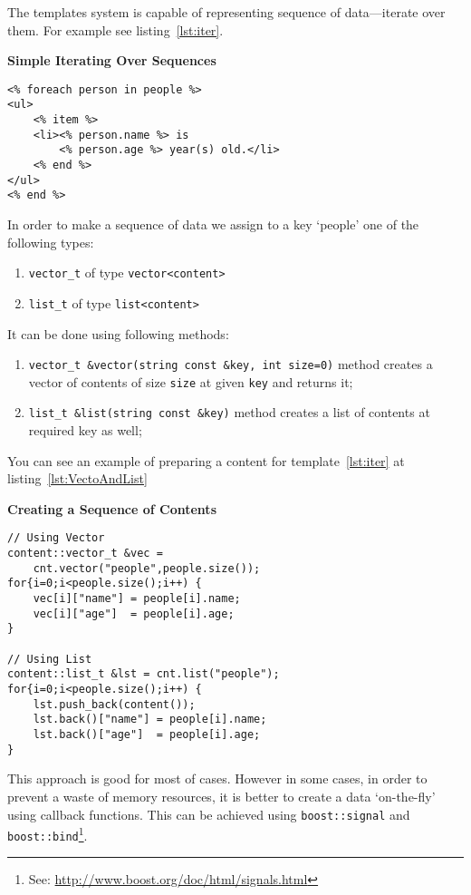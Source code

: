 \documentclass{article}
\newcommand{\tw}[1]{\texttt{#1}}
\renewcommand{\caption}[1]{\textbf{#1}}
\begin{document}
The templates system is capable of representing sequence of data---iterate over them. For example see listing~\ref{lst:iter}.

\begin{program}
\caption{Simple Iterating Over Sequences\label{lst:iter}}
\begin{verbatim}
<% foreach person in people %>
<ul>
    <% item %>
    <li><% person.name %> is 
        <% person.age %> year(s) old.</li>
    <% end %> 
</ul>
<% end %>
\end{verbatim}
\end{program}

In order to make a sequence of data we assign to a key `people' one of the following types:
\begin{enumerate}
\item \verb+vector_t+ of type \verb+vector<content>+
\item \verb+list_t+ of type \verb+list<content>+
\end{enumerate}
It can be done using following methods:
\begin{enumerate}
\item \verb+vector_t &vector(string const &key, int size=0)+ 
 method creates a vector of contents of size \tw{size} at given \tw{key} and returns it;
\item \verb+list_t &list(string const &key)+ 
 method creates a list of contents at required key as well;
\end{enumerate}

You can see an example of preparing a content for template~\ref{lst:iter} at listing~\ref{lst:VectoAndList}
\begin{program}
\caption{Creating a Sequence of Contents\label{lst:VectoAndList}}
\begin{verbatim}
// Using Vector
content::vector_t &vec = 
    cnt.vector("people",people.size());
for{i=0;i<people.size();i++) {
    vec[i]["name"] = people[i].name;
    vec[i]["age"]  = people[i].age;
}

// Using List
content::list_t &lst = cnt.list("people");
for{i=0;i<people.size();i++) {
    lst.push_back(content());
    lst.back()["name"] = people[i].name;
    lst.back()["age"]  = people[i].age;
}\end{verbatim}
\end{program}

This approach is good for most of cases. However in some cases, in order to prevent 
a waste of memory resources, it is better to create
a data `on-the-fly' using callback functions. This can be achieved using
\tw{boost::signal} and \tw{boost::bind}\footnote{See: \url{http://www.boost.org/doc/html/signals.html}}.
\end{document}
